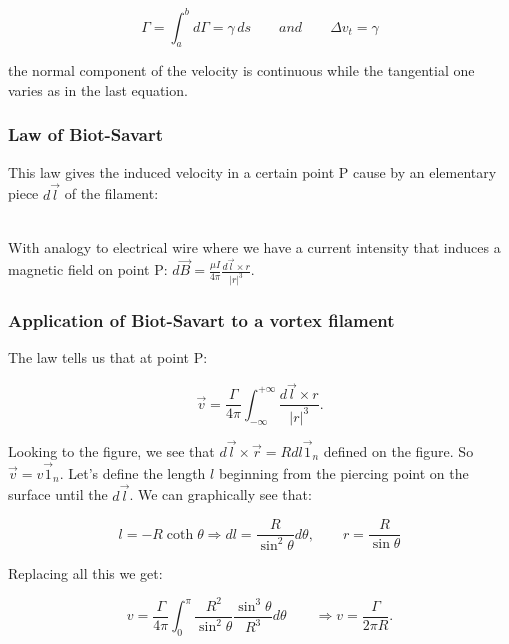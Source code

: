 	\begin{equation}
	\Gamma = \int _a ^b d\Gamma = \gamma \, ds \qquad and \qquad \Delta v_t = \gamma 
	\end{equation}
	
	the normal component of the velocity is continuous while the tangential one varies as in the last equation. 
	
\subsubsection{Law of Biot-Savart}
	This law gives the induced velocity in a certain point P cause by an elementary piece $d\vec{l}$ of the filament: 
	
	
	\ \\ With analogy to electrical wire where we have a current intensity that induces a magnetic field on point P: $d\vec{B} = \frac{\mu I }{4\pi} \frac{d\vec{l}\times r}{|r|^3}$. 
	
\subsubsection{Application of Biot-Savart to a vortex filament}
	The law tells us that at point P:
	
	\begin{equation}
	\vec{v} = \frac{\Gamma }{4\pi}\int _{-\infty}^{+\infty} \frac{d\vec{l}\times r}{|r|^3}.
	\end{equation}
	
	Looking to the figure, we see that $d\vec{l} \times \vec{r} = Rdl \vec{1}_n$ defined on the figure. So $\vec{v} = v \vec{1}_n$. Let's define the length $l$ beginning from the piercing point on the surface until the $d\vec{l}$. We can graphically see that: 
	
	\begin{equation}
	l  = -R \coth \theta \Rightarrow dl = \frac{R}{\sin ^2\theta} d\theta, \qquad r = \frac{R}{\sin \theta} 
	\end{equation}
	
	Replacing all this we get:
	
	\begin{equation}
	v = \frac{\Gamma}{4\pi} \int _{0}^{\pi} \frac{R^2}{\sin^2 \theta } \frac{\sin ^3 \theta}{R^3} d\theta \qquad \Rightarrow v = \frac{\Gamma}{2\pi R}.
	\end{equation}
	
